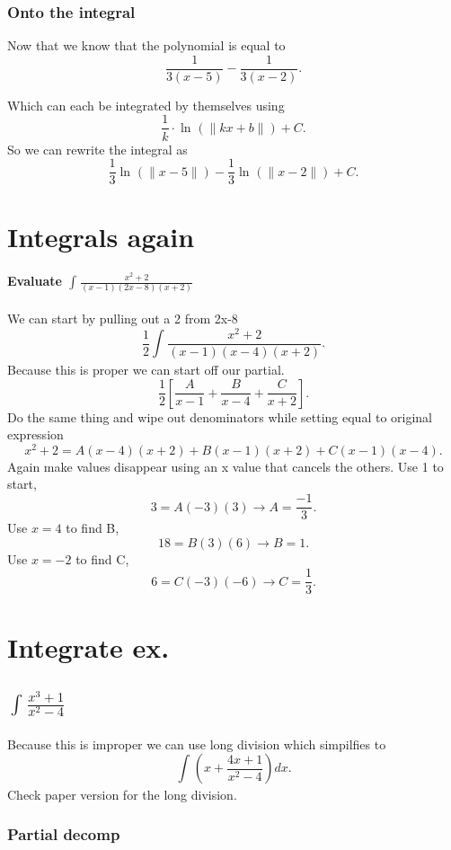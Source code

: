 \documentclass[a4paper]{article}
\begin{document}
\subsubsection{Onto the integral}
Now that we know that the polynomial is equal to 
\[
\frac{1}{3\left( x-5 \right)} -\frac{1}{3\left( x-2 \right)}
.\] 

Which can each be integrated by themselves using
\[
\frac{1}{k}\cdot \ln^{}(\|kx+b\|)+C
.\] 
So we can rewrite the integral as
\[
  \frac{1}{3}\ln^{}(\|x-5\|)-\frac{1}{3}\ln^{}(\|x-2\|)+C
.\] 

\section{Integrals again}%
\label{sec:}

\paragraph{Evaluate $\int_{}^{} \frac{x^2+2}{(x-1)(2x-8)(x+2)} $}
We can start by pulling out a 2 from 2x-8
\[
\frac{1}{2}\int_{}^{} \frac{x^2+2}{(x-1)(x-4)(x+2)} 
.\] 
Because this is proper we can start off our partial. 
\[
  \frac{1}{2}\left[\frac{A}{x-1}+\frac{B}{x-4}+\frac{C}{x+2}\right]
.\] 
Do the same thing and wipe out denominators while setting equal to original expression
\[
x^2+2=A(x-4)(x+2)+B(x-1)(x+2)+C(x-1)(x-4)
.\] 
Again make values disappear using an x value that cancels the others. Use 1 to start,
\[
3=A(-3)(3) \to A = \frac{-1}{3}
.\] 
Use $x=4$ to find B,
\[
18=B(3)(6) \to B=1
.\] 
Use $x=-2$ to find C,
\[
6=C(-3)(-6) \to C=\frac{1}{3}
.\] 

\newpage

\section{Integrate ex.}%
\label{sec:Integrate ex.}

\subsection{$\int_{}^{} \frac{x^3+1}{x^2-4} $}%
Because this is improper we can use long division which simpilfies to 
\[
\int_{}^{} (x+ \frac{4x+1}{x^2-4}) dx
.\] 
Check paper version for the long division. 
\subsubsection{Partial decomp}
\end{document}
